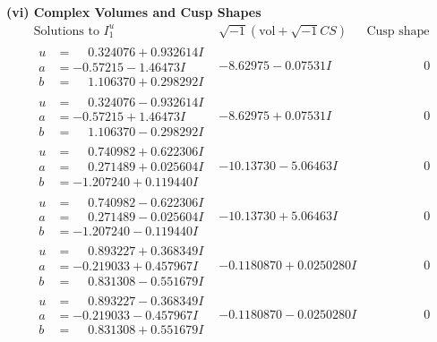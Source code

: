 \documentclass[1p]{elsarticle_modified}
\theoremstyle{definition}
\newcommand{\I}{\sqrt{-1}}
\begin{document}
\newpage\flushleft \textbf{(vi) Complex Volumes and Cusp Shapes}
$$\begin{array}{c|c|c}  
\text{Solutions to }I^u_{1}& \I (\text{vol} + \sqrt{-1}CS) & \text{Cusp shape}\\
 \hline 
\begin{aligned}
u &= \phantom{-}0.324076 + 0.932614 I \\
a &= -0.57215 - 1.46473 I \\
b &= \phantom{-}1.106370 + 0.298292 I\end{aligned}
 & -8.62975 - 0.07531 I & \phantom{-0.000000 } 0 \\ \hline\begin{aligned}
u &= \phantom{-}0.324076 - 0.932614 I \\
a &= -0.57215 + 1.46473 I \\
b &= \phantom{-}1.106370 - 0.298292 I\end{aligned}
 & -8.62975 + 0.07531 I & \phantom{-0.000000 } 0 \\ \hline\begin{aligned}
u &= \phantom{-}0.740982 + 0.622306 I \\
a &= \phantom{-}0.271489 + 0.025604 I \\
b &= -1.207240 + 0.119440 I\end{aligned}
 & -10.13730 - 5.06463 I & \phantom{-0.000000 } 0 \\ \hline\begin{aligned}
u &= \phantom{-}0.740982 - 0.622306 I \\
a &= \phantom{-}0.271489 - 0.025604 I \\
b &= -1.207240 - 0.119440 I\end{aligned}
 & -10.13730 + 5.06463 I & \phantom{-0.000000 } 0 \\ \hline\begin{aligned}
u &= \phantom{-}0.893227 + 0.368349 I \\
a &= -0.219033 + 0.457967 I \\
b &= \phantom{-}0.831308 - 0.551679 I\end{aligned}
 & -0.1180870 + 0.0250280 I & \phantom{-0.000000 } 0 \\ \hline\begin{aligned}
u &= \phantom{-}0.893227 - 0.368349 I \\
a &= -0.219033 - 0.457967 I \\
b &= \phantom{-}0.831308 + 0.551679 I\end{aligned}
 & -0.1180870 - 0.0250280 I & \phantom{-0.000000 } 0 \\ \hline\begin{aligned}

\end{aligned}
\end{array}$$
\end{document}
